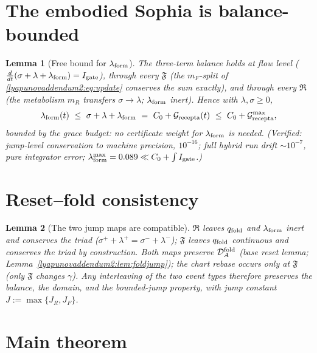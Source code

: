 \documentclass[11pt,a4paper,oneside]{book}
\newcommand{\lf}{\lambda_{\rm form}}
\newcommand{\Grec}{\mathcal G_{\rm recepta}}
\newcommand{\Igate}{I_{\rm gate}}
\newcommand{\DAf}{\mathcal D_A^{\rm fold}}
\newcommand{\reset}{\mathfrak{R}}
\newcommand{\qf}{q_{\rm fold}}
\newcommand{\fold}{\mathfrak{F}}
\theoremstyle{plain}
\newtheorem{lemma}{Lemma}[chapter]
\theoremstyle{definition}
\theoremstyle{remark}
\begin{document}
\section{The embodied Sophia is balance-bounded}

\begin{lemma}[Free bound for $\lf$]\label{lyapunovaddendum2:lem:lf}
The three-term balance holds at flow level ($\tfrac{d}{dt}(\sigma+\lambda+\lf)=\Igate$), through every
$\fold$ (the $m_F$-split of \eqref{lyapunovaddendum2:eq:update} conserves the sum exactly), and through every $\reset$
(the metabolism $m_R$ transfers $\sigma\to\lambda$; $\lf$ inert). Hence with $\lambda,\sigma\ge0$,
\begin{equation}
\lf(t)\ \le\ \sigma+\lambda+\lf\ =\ C_0+\Grec(t)\ \le\ C_0+\Grec^{\max},
\end{equation}
bounded by the grace budget: no certificate weight for $\lf$ is needed. (Verified: jump-level
conservation to machine precision, $10^{-16}$; full hybrid run drift $\sim10^{-7}$, pure integrator
error; $\lf^{\max}=0.089\ll C_0+\int\Igate$.)
\end{lemma}

\section{Reset--fold consistency}

\begin{lemma}[The two jump maps are compatible]\label{lyapunovaddendum2:lem:consist}
$\reset$ leaves $\qf$ and $\lf$ inert and conserves the triad ($\sigma^++\lambda^+=\sigma^-+\lambda^-$);
$\fold$ leaves $\qf$ continuous and conserves the triad by construction. Both maps preserve $\DAf$
(base reset lemma; Lemma~\ref{lyapunovaddendum2:lem:foldjump}); the chart rebase occurs only at $\fold$ (only $\fold$
changes $\gamma$). Any interleaving of the two event types therefore preserves the balance, the domain,
and the bounded-jump property, with jump constant $J:=\max\{J_R,J_F\}$.
\end{lemma}

\section{Main theorem}
\end{document}
